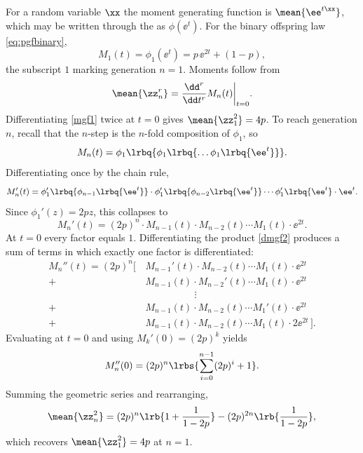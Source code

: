 For a random variable \(\xx\) the moment generating function is \(\mean{\ee^{t\xx}}\), which may be written through the \pgf{} as \(\phi(\ee^t)\). For the binary offspring law \cref{eq:pgfbinary},
\begin{equation}
\label{mgf1}
M_1(t) = \phi_1(\ee^t) = p\,\ee^{2t} + (1-p),
\end{equation}
the subscript \(1\) marking generation \(n=1\). Moments follow from
\begin{equation}
\label{mgf2}
\mean{\zz_n^r} = \frac{\dd^r}{\dd t^r}M_n(t)\bigg|_{t=0}.
\end{equation}
Differentiating \cref{mgf1} twice at \(t=0\) gives \(\mean{\zz_1^2}=4p\). To reach generation \(n\), recall that the \(n\)-step \pgf{} is the \(n\)-fold composition of \(\phi_1\), so
\begin{equation*}
M_n(t) = \phi_1\lrbq{\phi_1\lrbq{\dots\phi_1\lrbq{\ee^t}}}.
\end{equation*}
Differentiating once by the chain rule,
\begin{equation}
\label{dmgf1}
M_n'(t) = \phi_1'\lrbq{\phi_{n-1}\lrbq{\ee^t}}\cdot\phi_1'\lrbq{\phi_{n-2}\lrbq{\ee^t}}\cdots\phi_1'\lrbq{\ee^t}\cdot\ee^t .
\end{equation}
Since \(\phi_1'(z)=2pz\), this collapses to
\begin{equation}
\label{dmgf2}
M_n'(t) = (2p)^n\cdot M_{n-1}(t)\cdot M_{n-2}(t)\cdots M_1(t)\cdot\ee^{2t}.
\end{equation}
At \(t=0\) every factor equals \(1\). Differentiating the product \cref{dmgf2} produces a sum of terms in which exactly one factor is differentiated:
\begin{align*}
M_n''(t) = (2p)^n\bigg[\,&M_{n-1}'(t)\cdot M_{n-2}(t)\cdots M_1(t)\cdot\ee^{2t}\\
+ &M_{n-1}(t)\cdot M_{n-2}'(t)\cdots M_1(t)\cdot\ee^{2t}\\
&\hspace{60pt}\vdots\\
+ &M_{n-1}(t)\cdot M_{n-2}(t)\cdots M_1'(t)\cdot\ee^{2t}\\
+ &M_{n-1}(t)\cdot M_{n-2}(t)\cdots M_1(t)\cdot 2\ee^{2t}\,\bigg].
\end{align*}
Evaluating at \(t=0\) and using \(M_k'(0)=(2p)^k\) yields
\begin{equation*}
M_n''(0) = (2p)^n\lrbs{\sum_{i=0}^{n-1}(2p)^i + 1}.
\end{equation*}
Summing the geometric series and rearranging,
\begin{equation}
\label{secondMoment}
\mean{\zz_n^2} = (2p)^n\lrb{1 + \frac{1}{1-2p}} - (2p)^{2n}\lrb{\frac{1}{1-2p}},
\end{equation}
which recovers \(\mean{\zz_1^2}=4p\) at \(n=1\).

